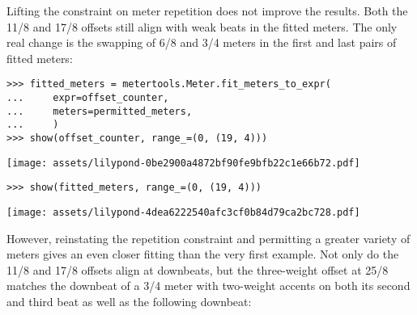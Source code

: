 \noindent Lifting the constraint on meter repetition does not improve the
results. Both the 11/8 and 17/8 offsets still align with weak beats in the
fitted meters. The only real change is the swapping of 6/8 and 3/4 meters in
the first and last pairs of fitted meters:

\begin{comment}
<abjad>
fitted_meters = metertools.Meter.fit_meters_to_expr(
    expr=offset_counter,
    meters=permitted_meters,
    )
show(offset_counter, range_=(0, (19, 4)))
show(fitted_meters, range_=(0, (19, 4)))
</abjad>
\end{comment}

\begin{singlespacing}
\vspace{-0.5\baselineskip}
\begin{lstlisting}
>>> fitted_meters = metertools.Meter.fit_meters_to_expr(
...     expr=offset_counter,
...     meters=permitted_meters,
...     )
>>> show(offset_counter, range_=(0, (19, 4)))
\end{lstlisting}
\noindent\texttt{[image: assets/lilypond-0be2900a4872bf90fe9bfb22c1e66b72.pdf]}
\begin{lstlisting}
>>> show(fitted_meters, range_=(0, (19, 4)))
\end{lstlisting}
\noindent\texttt{[image: assets/lilypond-4dea6222540afc3cf0b84d79ca2bc728.pdf]}
\end{singlespacing}

\noindent However, reinstating the repetition constraint and permitting a
greater variety of meters gives an even closer fitting than the very first
example. Not only do the 11/8 and 17/8 offsets align at downbeats, but the
three-weight offset at 25/8 matches the downbeat of a 3/4 meter with two-weight
accents on both its second and third beat as well as the following downbeat:

\begin{comment}
<abjad>
permitted_meters = metertools.MeterInventory([
    (2, 4), (4, 8), (3, 4), (6, 8), (7, 8), (4, 4),
    ])
fitted_meters = metertools.Meter.fit_meters_to_expr(
    expr=offset_counter,
    maximum_run_length=1,
    meters=permitted_meters,
    )
show(offset_counter, range_=(0, (19, 4)))
show(fitted_meters, range_=(0, (19, 4)))
</abjad>
\end{comment}

